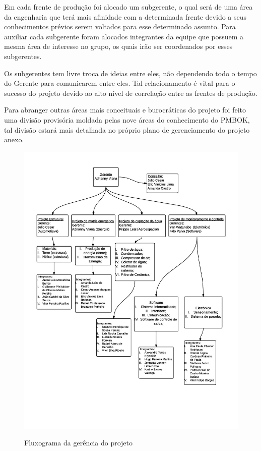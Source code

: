     Em cada frente de produção foi alocado um subgerente, o qual será de uma área da engenharia que terá mais afinidade
    com a determinada frente devido a seus conhecimentos prévios serem voltados para esse determinado assunto.
    Para auxiliar cada subgerente foram alocados integrantes da equipe que possuem a mesma área de interesse no grupo,
    os quais irão ser coordenados por esses subgerentes.

    Os subgerentes tem livre troca de ideias entre eles, não dependendo todo o tempo do Gerente para comunicarem entre eles. 
    Tal relacionamento é vital para o sucesso do projeto devido ao alto nível de correlação entre as frentes de produção.

    Para abranger outras áreas mais conceituais e burocráticas do projeto foi feito uma divisão provisória moldada pelas
    nove áreas do conhecimento do PMBOK, tal divisão estará mais detalhada no próprio plano de gerenciamento do projeto anexo.
    
    \begin{figure}[!h]
      \centering
      \includegraphics[scale = 0.27]{editaveis/figuras/Fluxograma_gerencia}
      \label{fluxograma_gerencia_projeto}
      \caption{Fluxograma da gerência do projeto}
    \end{figure}
    \FloatBarrier
    
